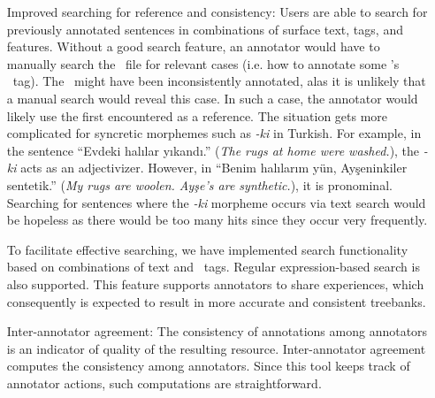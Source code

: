 \begin{itemize}[before=\normalfont, font=\itshape, align=left,noitemsep,topsep=0pt,parsep=0pt,partopsep=0pt,labelsep=3pt,align=left]
    \item[Improved searching for reference and consistency:]
        Users are able to search for previously annotated sentences in combinations of surface text, tags, and features. 
		Without a good search feature, an annotator would have to manually search the \conllu\ file for relevant cases (i.e. how to annotate some \form's \upos\ tag).
		The \form\ might have been inconsistently annotated, alas it is unlikely that a manual search would reveal this case.
		In such a case, the annotator would likely use the first encountered as a reference. 
        The situation gets more complicated for syncretic morphemes such as \textit{-ki} in Turkish.
        For example, in the sentence ``Evdeki halılar yıkandı.'' (\textit{The rugs at home were washed.}), the \textit{-ki} acts as an adjectivizer.
        However, in ``Benim halılarım yün, Ayşeninkiler sentetik.'' (\textit{My rugs are woolen. Ayşe's are synthetic.}), it is pronominal.
        Searching for sentences where the \textit{-ki} morpheme occurs via text search would be hopeless as there would be too many hits since they occur very frequently.

        To facilitate effective searching, we have implemented search functionality based on combinations of text and \ud\ tags.
        Regular expression-based search is also supported.
        This feature supports annotators to share experiences, which consequently is expected to result in more accurate and consistent treebanks.
        
    \item[Inter-annotator agreement:]
        The consistency of annotations among annotators is an indicator of quality of the resulting resource.
        Inter-annotator agreement computes the consistency among annotators.
        Since this tool keeps track of annotator actions, such computations are straightforward.

\end{itemize}

